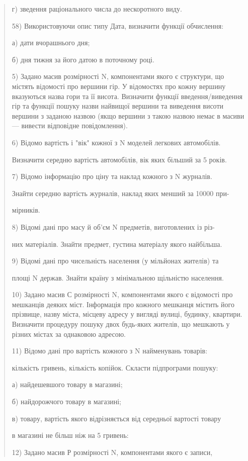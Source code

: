 \documentclass[]{article}
\begin{document}
\begin{quote}
г) зведення раціонального числа до нескоротного виду.

58) Використовуючи опис типу Дата, визначити функції обчислення:

а) дати вчорашнього дня;

б) дня тижня за його датою в поточному році.

5) Задано масив розмірності N, компонентами якого є структури, що
містять відомості про вершини гір. У відомостях про кожну вершину
вказуються назва гори та її висота. Визначити функції введення/виведення
гір та функції пошуку назви найвищої вершини та виведення висоти вершини
з заданою назвою (якщо вершини з такою назвою немає в масиви --- вивести
відповідне повідомлення).

6) Відомо вартість і "вік" кожної з N моделей легкових автомобілів.

Визначити середню вартість автомобілів, вік яких більший за 5 років.

7) Відомо інформацію про ціну та наклад кожного з N журналів.

Знайти середню вартість журналів, наклад яких менший за 10000 при-

мірників.

8) Відомі дані про масу й об'єм N предметів, виготовлених із різ-

них матеріалів. Знайти предмет, густина матеріалу якого найбільша.

9) Відомі дані про чисельність населення (у мільйонах жителів) та

площі N держав. Знайти країну з мінімальною щільністю населення.

10) Задано масив С розмірності N, компонентами якого є відомості про
мешканців деяких міст. Інформація про кожного мешканця містить його
прізвище, назву міста, місцеву адресу у вигляді вулиці, будинку,
квартири. Визначити процедуру пошуку двох будь-яких жителів, що мешкають
у різних містах за однаковою адресою.

11) Відомо дані про вартість кожного з N найменувань товарів:

кількість гривень, кількість копійок. Скласти підпрограми пошуку:

а) найдешевшого товару в магазині;

б) найдорожчого товару в магазині;

в) товару, вартість якого відрізняється від середньої вартості товару

в магазині не більш ніж на 5 гривень:

12) Задано масив Р розмірності N, компонентами якого є записи,


\end{quote}
\end{document}
